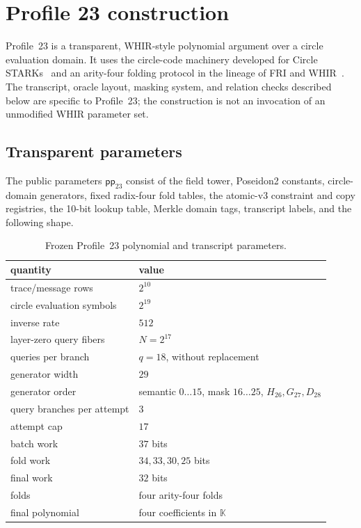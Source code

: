 \section{Profile 23 construction}
\label{sec:construction}

Profile~23 is a transparent, WHIR-style polynomial argument over a circle
evaluation domain.  It uses the circle-code machinery developed for Circle
STARKs~\cite{HaboeckLevitPapini2024} and an arity-four folding protocol in the
lineage of FRI and WHIR~\cite{BenSassonBentovHoreshRiabzev2018FRI,ArnonChiesaFenziYogev2025WHIR}.
The transcript, oracle layout, masking system, and relation checks described
below are specific to Profile~23; the construction is not an invocation of an
unmodified WHIR parameter set.

\subsection{Transparent parameters}

\begin{definition}
\label{def:profile23-transparent-parameters}
The public parameters \(\mathsf{pp}_{23}\) consist of the field tower,
Poseidon2 constants, circle-domain generators, fixed radix-four fold tables,
the atomic-v3 constraint and copy registries, the 10-bit lookup table, Merkle
domain tags, transcript labels, and the following shape.
\end{definition}

\begin{table}[t]
\centering
\caption{Frozen Profile~23 polynomial and transcript parameters.}
\label{tab:profile23-parameters}
\begin{tabular}{@{}ll@{}}
\toprule
quantity & value \\
\midrule
trace/message rows & \(2^{10}\) \\
circle evaluation symbols & \(2^{19}\) \\
inverse rate & \(512\) \\
layer-zero query fibers & \(N=2^{17}\) \\
queries per branch & \(q=18\), without replacement \\
generator width & \(29\) \\
generator order & semantic \(0\ldots15\), mask \(16\ldots25\), \(H_{26},G_{27},D_{28}\) \\
query branches per attempt & \(3\) \\
attempt cap & \(17\) \\
batch work & \(37\) bits \\
fold work & \(34,33,30,25\) bits \\
final work & \(32\) bits \\
folds & four arity-four folds \\
final polynomial & four coefficients in \(\mathbb K\) \\
\bottomrule
\end{tabular}
\end{table}

